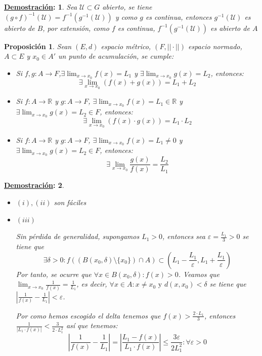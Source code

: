 \documentclass[10pt,a4paper,openright]{book}
\theoremstyle{break}
\newtheorem*{prop}{Proposición}
\newtheorem*{demo}{\underline{Demostración}:}
\begin{document}
\begin{demo}
Sea $\mathcal{U} \subset G$ abierto, se tiene $(g \circ f)^{-1} (\mathcal{U}) = f^{-1}(g^{-1} (\mathcal{U}))$ y como $g$ es continua, entonces $g^{-1}(\mathcal{U})$ es abierto de $B$, por extensión, como $f$ es continua, $f^{-1}(g^{-1} (\mathcal{U}))$ es abierto de $A$
\end{demo}

\begin{prop}
Sean $(E,d)$ espacio métrico, $(F, || \cdot ||)$ espacio normado, $A \subset E$ y $x_0 \in A'$ un punto de acumulación, se cumple:
\begin{itemize}
\item Si $f,g : A \to F$,$\exists \lim_{x \to x_0} f(x) = L_1$ y $\exists \lim_{x \to x_0} g(x) = L_2$, entonces:
$$\exists \lim_{x \to x_0} (f(x) + g(x)) = L_1 + L_2$$

\item Si $f: A \to \mathbb{R}$ y $g: A \to F$, $\exists \lim_{x \to x_0} f(x) = L_1 \in \mathbb{R}$ y $\exists \lim_{x \to x_0} g(x) = L_2 \in F$, entonces:
$$\exists \lim_{x \to x_0} (f(x) \cdot g(x)) = L_1 \cdot L_2$$

\item Si $f: A \to \mathbb{R}$ y $g: A \to F$, $\exists \lim_{x \to x_0} f(x) = L_1 \neq 0$ y $\exists \lim_{x \to x_0} g(x) = L_2 \in F$, entonces:
$$\exists \lim_{x \to x_0} \frac{g(x)}{f(x)} = \frac{L_2}{L_1}$$
\end{itemize}
\end{prop}
\begin{demo}
\begin{itemize}
\item $(i), (ii)$ son fáciles
\item $(iii)$

Sin pérdida de generalidad, supongamos $L_1 > 0$, entonces sea $\varepsilon = \frac{L_1}{3} > 0$ se tiene que
$$\exists \delta > 0 : f\left((B(x_0, \delta) \setminus \{x_0\}) \cap A\right) \subset \left(L_1 - \frac{L_1}{\varepsilon}, L_1 + \frac{L_1}{\varepsilon}\right)$$
Por tanto, se ocurre que $\forall x \in B(x_0, \delta) : f(x) > 0$. Veamos que $\lim_{x \to x_0} \frac{1}{f(x)} = \frac{1}{L_1}$, es decir, $ \forall x \in A : x \neq x_0 \mbox{ y } d(x, x_0) < \delta$ se tiene que $\left| \frac{1}{f(x)}  - \frac{1}{L_1} \right| < \varepsilon$.

Por como hemos escogido el delta tenemos que $f(x) > \frac{2 \cdot L_1}{3}$, entonces $\frac{1}{|L_1 \cdot f(x)|} < \frac{3}{2 \cdot L_1^2}$ así que tenemos:
$$\left| \frac{1}{f(x)}  - \frac{1}{L_1} \right| = \left| \frac{L_1 - f(x)}{L_1 \cdot f(x)} \right| \leq \frac{3 \varepsilon}{2 L_1^2} : \forall \varepsilon >0$$
\end{itemize}
\end{demo}
\end{document}
